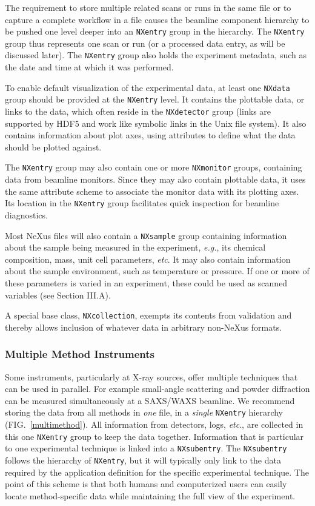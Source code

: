 \documentclass[%
 aip,
rsi,
 amsmath,amssymb,
 reprint,%
]{revtex4-1}
\begin{document}
The requirement to store multiple related scans or runs  in the same file or to capture 
a complete workflow in a file causes the beamline component hierarchy to be pushed one level deeper into an \texttt{NXentry} 
group in the hierarchy. The \texttt{NXentry}  group thus represents one scan or run (or a processed data entry, as will be discussed later). 
The \texttt{NXentry} group also holds the experiment metadata, such as the date and time at which it was performed. 

To enable default visualization of the experimental data,
at least one \texttt{NXdata} group should be provided at the \texttt{NXentry} level.
It contains the plottable data, or links to the data, which often reside in the \texttt{NXdetector} group (links are supported by HDF5 and work like 
symbolic links in the Unix file system).  It also contains information about plot axes, using attributes to define what 
the data should be plotted against.

The \texttt{NXentry} group may also contain one or more \texttt{NXmonitor} groups, containing data from beamline monitors. Since they may
also contain plottable data, it uses the same attribute scheme to associate the monitor data with its plotting axes. Its location in the
\texttt{NXentry} group facilitates quick inspection for beamline diagnostics.

Most NeXus files will also contain a \texttt{NXsample} group containing information about the sample being measured in the experiment, \emph{e.g.}, 
its chemical composition, mass, unit cell parameters, \emph{etc}. It may also contain information about the sample environment, such as
temperature or pressure. If one or more of these parameters is varied in an experiment, these could be used as scanned variables (see
Section III.A).

A special base class, \texttt{NXcollection}, exempts its contents from validation
and thereby allows inclusion of whatever data in arbitrary non-NeXus formats.

\subsubsection{Multiple Method Instruments}

Some instruments, particularly at X-ray sources, offer multiple techniques that can be used in parallel.
For example small-angle scattering and powder diffraction 
can be measured simultaneously at a SAXS/WAXS beamline.
We recommend storing the data from all methods in \emph{one} file,
in a \emph{single} \texttt{NXentry} hierarchy
(FIG.~\ref{multimethod}). All information from detectors, logs, \emph{etc}.,
 are collected in this one \texttt{NXentry} group to keep the data together.
Information that is particular to one experimental technique
is linked into a \texttt{NXsubentry}. The \texttt{NXsubentry} follows the hierarchy of 
\texttt{NXentry}, but it will typically only link to the data required by the 
application definition for the specific experimental technique. The point of this scheme 
is that both humans and computerized users can easily locate method-specific data while 
maintaining the full view of the experiment.   
\end{document}
